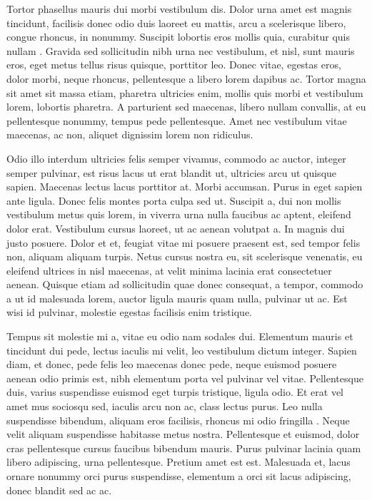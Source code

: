 \begin{singlespace}
\im
Tortor phasellus mauris dui morbi vestibulum dis.
Dolor urna amet est magnis tincidunt, facilisis donec odio duis laoreet eu mattis, arcu a scelerisque libero, congue rhoncus, in nonummy.
Suscipit lobortis eros mollis quia, curabitur quis nullam \cite{feynman1982}.
Gravida sed sollicitudin nibh urna nec vestibulum, et nisl, sunt mauris eros, eget metus tellus risus quisque, porttitor leo.
Donec vitae, egestas eros, dolor morbi, neque rhoncus, pellentesque a libero lorem dapibus ac.
Tortor magna sit amet sit massa etiam, pharetra ultricies enim, mollis quis morbi et vestibulum lorem, lobortis pharetra.
A parturient sed maecenas, libero nullam convallis, at eu pellentesque nonummy, tempus pede pellentesque.
Amet nec vestibulum vitae maecenas, ac non, aliquet dignissim lorem non ridiculus.
\end{singlespace}

\begin{singlespace}
\im
Odio illo interdum ultricies felis semper vivamus, commodo ac auctor, integer semper pulvinar, est risus lacus ut erat blandit ut, ultricies arcu ut quisque sapien.
Maecenas lectus lacus porttitor at.
Morbi accumsan.
Purus in eget sapien ante ligula.
Donec felis montes porta culpa sed ut.
Suscipit a, dui non mollis vestibulum metus quis lorem, in viverra urna nulla faucibus ac aptent, eleifend dolor erat.
Vestibulum cursus laoreet, ut ac aenean volutpat a.
In magnis dui justo posuere.
Dolor et et, feugiat vitae mi posuere praesent est, sed tempor felis non, aliquam aliquam turpis.
Netus cursus nostra eu, sit scelerisque venenatis, eu eleifend ultrices in nisl maecenas, at velit minima lacinia erat consectetuer aenean.
Quisque etiam ad sollicitudin quae donec consequat, a tempor, commodo a ut id malesuada lorem, auctor ligula mauris quam nulla, pulvinar ut ac.
Est wisi id pulvinar, molestie egestas facilisis enim tristique.
\end{singlespace}

\begin{singlespace}
\bi
Tempus sit molestie mi a, vitae eu odio nam sodales dui.
Elementum mauris et tincidunt dui pede, lectus iaculis mi velit, leo vestibulum dictum integer.
Sapien diam, et donec, pede felis leo maecenas donec pede, neque euismod posuere aenean odio primis est, nibh elementum porta vel pulvinar vel vitae.
Pellentesque duis, varius suspendisse euismod eget turpis tristique, ligula odio.
Et erat vel amet mus sociosqu sed, iaculis arcu non ac, class lectus purus.
Leo nulla suspendisse bibendum, aliquam eros facilisis, rhoncus mi odio fringilla \cite{watson1953}.
Neque velit aliquam suspendisse habitasse metus nostra.
Pellentesque et euismod, dolor cras pellentesque cursus faucibus bibendum mauris.
Purus pulvinar lacinia quam libero adipiscing, urna pellentesque.
Pretium amet est est.
Malesuada et, lacus ornare nonummy orci purus suspendisse, elementum a orci sit lacus adipiscing, donec blandit sed ac ac.
\end{singlespace}

